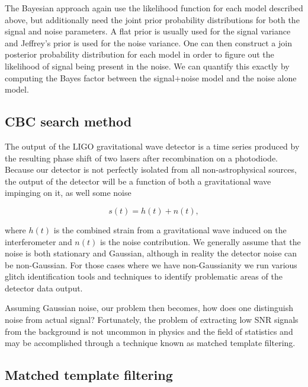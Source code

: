 The Bayesian approach again use the likelihood function for each model described above, but additionally need the joint prior probability distributions for both the signal and noise parameters. A flat prior is usually used for the signal variance and Jeffrey’s prior is used for the noise variance. One can then construct a join posterior probability distribution for each model in order to figure out the likelihood of signal being present in the noise. We can quantify this exactly by computing the Bayes factor between the signal+noise model and the noise alone model.


%
%



\subsection{\ac{CBC} search method}

The output of the \ac{LIGO} gravitational wave detector is a time series produced by the resulting phase shift of two lasers after recombination on a photodiode. Because our detector is not perfectly isolated from all non-astrophysical sources, the output of the detector will be a function of both a gravitational wave impinging on it, as well some noise

\begin{equation}
    s(t) = h(t) + n(t),
\end{equation}{}

where $h(t)$ is the combined strain from a gravitational wave induced on the interferometer and $n(t)$ is the noise contribution. We generally assume that the noise is both stationary and Gaussian, although in reality the detector noise can be non-Gaussian. For those cases where we have non-Gaussianity we run various glitch identification tools and techniques to identify problematic areas of the detector data output. 

Assuming Gaussian noise, our problem then becomes, how does one distinguish noise from actual signal? Fortunately, the problem of extracting low \ac{SNR} signals from the background is not uncommon in physics and the field of statistics and may be accomplished through a technique known as matched template filtering.

\subsection{Matched template filtering}

